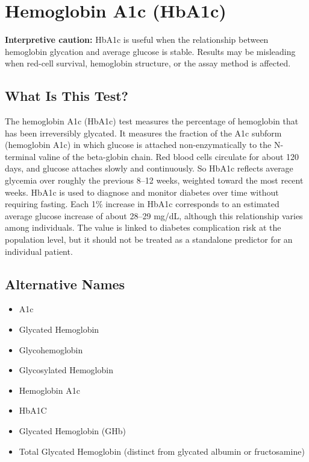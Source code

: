 \chapter{Hemoglobin A1c (HbA1c)}

\textbf{Interpretive caution:} HbA1c is useful when the relationship between hemoglobin glycation and average glucose is stable. Results may be misleading when red-cell survival, hemoglobin structure, or the assay method is affected.

\section*{What Is This Test?}
The hemoglobin A1c (HbA1c) test measures the percentage of hemoglobin that has been irreversibly glycated. It measures the fraction of the A1c subform (hemoglobin A1c) in which glucose is attached non-enzymatically to the N-terminal valine of the beta-globin chain. Red blood cells circulate for about 120 days, and glucose attaches slowly and continuously. So HbA1c reflects average glycemia over roughly the previous 8--12 weeks, weighted toward the most recent weeks. HbA1c is used to diagnose and monitor diabetes over time without requiring fasting. Each 1\% increase in HbA1c corresponds to an estimated average glucose increase of about 28--29 mg/dL, although this relationship varies among individuals. The value is linked to diabetes complication risk at the population level, but it should not be treated as a standalone predictor for an individual patient.

\section*{Alternative Names}
\begin{itemize}
  \item A1c
  \item Glycated Hemoglobin
  \item Glycohemoglobin
  \item Glycosylated Hemoglobin
  \item Hemoglobin A1c
  \item HbA1C
  \item Glycated Hemoglobin (GHb)
  \item Total Glycated Hemoglobin (distinct from glycated albumin or fructosamine)
\end{itemize}

